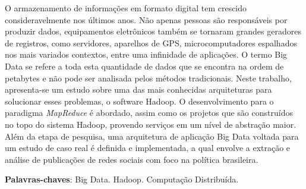 \begin{resumo}

O armazenamento de informações em formato digital tem crescido consideravelmente nos últimos anos. Não apenas pessoas são responsáveis por produzir dados, equipamentos eletrônicos também se tornaram grandes geradores de registros, como servidores, aparelhos de GPS, microcomputadores espalhados nos mais variados contextos, entre uma infinidade de aplicações. O termo Big Data se refere a toda esta quantidade de dados que se encontra na ordem de petabytes e não pode ser analisada pelos métodos tradicionais. Neste trabalho, apresenta-se um estudo sobre uma das mais conhecidas arquiteturas para solucionar esses problemas, o software Hadoop. O desenvolvimento para o paradigma \textit{MapReduce} é abordado, assim como os projetos que são construídos no topo do sistema Hadoop, provendo serviços em um nível de abstração maior. Além da etapa de pesquisa, uma arquitetura de aplicação Big Data voltada para um estudo de caso real é definida e implementada, a qual envolve a extração e análise de publicações de redes sociais com foco na política brasileira.

 \vspace{\onelineskip}
    
 \noindent
 \textbf{Palavras-chaves}: Big Data. Hadoop. Computação Distribuída.
\end{resumo}
